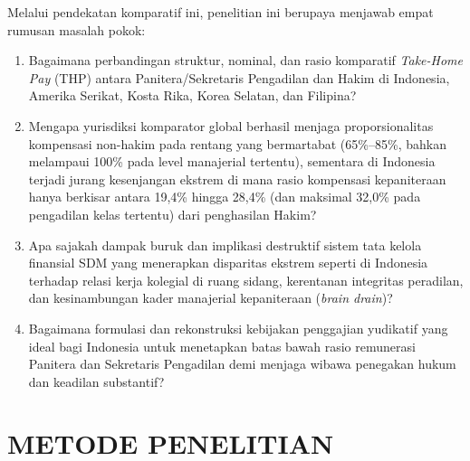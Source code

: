\documentclass[12pt, a4paper]{article}
\begin{document}
Melalui pendekatan komparatif ini, penelitian ini berupaya menjawab empat rumusan masalah pokok:
\begin{enumerate}
    \item Bagaimana perbandingan struktur, nominal, dan rasio komparatif \textit{Take-Home Pay} (THP) antara Panitera/Sekretaris Pengadilan dan Hakim di Indonesia, Amerika Serikat, Kosta Rika, Korea Selatan, dan Filipina?
    \item Mengapa yurisdiksi komparator global berhasil menjaga proporsionalitas kompensasi non-hakim pada rentang yang bermartabat (65\%--85\%, bahkan melampaui 100\% pada level manajerial tertentu), sementara di Indonesia terjadi jurang kesenjangan ekstrem di mana rasio kompensasi kepaniteraan hanya berkisar antara 19,4\% hingga 28,4\% (dan maksimal 32,0\% pada pengadilan kelas tertentu) dari penghasilan Hakim?
    \item Apa sajakah dampak buruk dan implikasi destruktif sistem tata kelola finansial SDM yang menerapkan disparitas ekstrem seperti di Indonesia terhadap relasi kerja kolegial di ruang sidang, kerentanan integritas peradilan, dan kesinambungan kader manajerial kepaniteraan (\textit{brain drain})?
    \item Bagaimana formulasi dan rekonstruksi kebijakan penggajian yudikatif yang ideal bagi Indonesia untuk menetapkan batas bawah rasio remunerasi Panitera dan Sekretaris Pengadilan demi menjaga wibawa penegakan hukum dan keadilan substantif?
\end{enumerate}

\section{METODE PENELITIAN}
\end{document}
